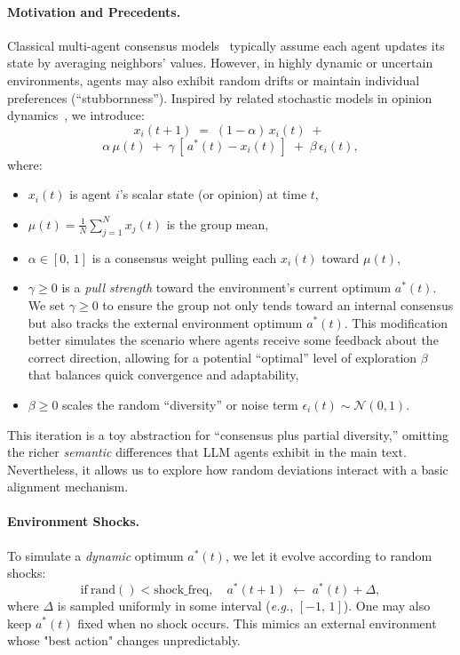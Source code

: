 \paragraph{Motivation and Precedents.}
Classical multi-agent consensus models~\cite{degroot1974reaching,olfati2007consensus} typically assume each agent updates its state by averaging neighbors' values. However, in highly dynamic or uncertain environments, agents may also exhibit random drifts or maintain individual preferences (``stubbornness''). Inspired by related stochastic models in opinion dynamics~\cite{friedkin2011social, hegselmann2002opinion}, we introduce:
\[
    x_i(t+1) 
    \;=\; 
    (1-\alpha)\,x_i(t) 
    \;+\;
\]
\[
    \alpha \,\mu(t)
    \;+\;
    \gamma\,[\,a^*(t)-x_i(t)\,]
    \;+\;
    \beta \,\epsilon_i(t),
\]
where:
\begin{itemize}
    \item $x_i(t)$ is agent $i$'s scalar state (or opinion) at time $t$,
    \item $\mu(t)=\tfrac{1}{N}\sum_{j=1}^N x_j(t)$ is the group mean,
    \item $\alpha \in [0,\,1]$ is a consensus weight pulling each $x_i(t)$ toward $\mu(t)$,
    \item $\gamma \geq 0$ is a \emph{pull strength} toward the environment’s current optimum $a^*(t)$. We set $\gamma \geq 0$ to ensure the group not only tends toward an internal consensus but also tracks the external environment optimum $a^*(t)$. This modification better simulates the scenario where agents receive some feedback about the correct direction, allowing for a potential “optimal” level of exploration $\beta$ that balances quick convergence and adaptability,
    \item $\beta \geq 0$ scales the random “diversity” or noise term $\epsilon_i(t)\sim \mathcal{N}(0,1)$.
\end{itemize}
This iteration is a toy abstraction for “consensus plus partial diversity,” omitting the richer \emph{semantic} differences that LLM agents exhibit in the main text. Nevertheless, it allows us to explore how random deviations interact with a basic alignment mechanism.

\paragraph{Environment Shocks.}
To simulate a \emph{dynamic} optimum $a^*(t)$, we let it evolve according to random shocks:
\[
\text{if}~\mathrm{rand}() < \mathrm{shock\_freq},
\quad
a^*(t+1) \;\leftarrow\; a^*(t) + \Delta,
\]
where $\Delta$ is sampled uniformly in some interval (\emph{e.g.}, $[-1,\,1]$). One may also keep $a^*(t)$ fixed when no shock occurs. This mimics an external environment whose "best action" changes unpredictably.

